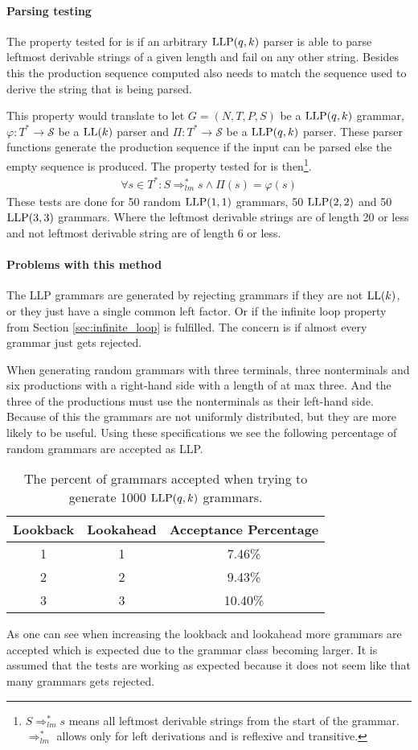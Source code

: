 \paragraph{Parsing testing}
The property tested for is if an arbitrary $\text{LLP}(q,k)$ parser is able to parse leftmost derivable strings of a given length and fail on any other string. Besides this the production sequence computed also needs to match the sequence used to derive the string that is being parsed.

This property would translate to let $G = (N, T, P, S)$ be a $\text{LLP}(q, k)$ grammar, $\varphi : T^* \to \mathcal{S}$ be a $\text{LL}(k)$ parser and $\Pi : T^* \to \mathcal{S}$ be a $\text{LLP}(q, k)$ parser. These parser functions generate the production sequence if the input can be parsed else the empty sequence is produced. The property tested for is then\footnote{$S \Rightarrow^*_{lm} s$ means all leftmost derivable strings from the start of the grammar. $\Rightarrow^*_{lm}$ allows only for left derivations and is reflexive and transitive.}.
\begin{align*}
    \forall s \in T^* : S \Rightarrow^*_{lm} s \land \Pi(s) = \varphi(s)
\end{align*}
These tests are done for 50 random $\text{LLP}(1,1)$ grammars, 50 $\text{LLP}(2,2)$ and 50 $\text{LLP}(3,3)$ grammars. Where the leftmost derivable strings are of length 20 or less and not leftmost derivable string are of length 6 or less.

\paragraph{Problems with this method}
The LLP grammars are generated by rejecting grammars if they are not $\text{LL}(k)$, or they just have a single common left factor. Or if the infinite loop property from Section \ref{sec:infinite_loop} is fulfilled. The concern is if almost every grammar just gets rejected.

When generating random grammars with three terminals, three nonterminals and six productions with a right-hand side with a length of at max three. And the three of the productions must use the nonterminals as their left-hand side. Because of this the grammars are not uniformly distributed, but they are more likely to be useful. Using these specifications we see the following percentage of random grammars are accepted as LLP.
\begin{table}[H]
    \centering
    \begin{tabular}{c|c|c}
        Lookback & Lookahead & Acceptance Percentage  \\ \hline
        1 & 1 & 7.46\%  \\\hline
        2 & 2 & 9.43\%  \\\hline
        3 & 3 & 10.40\%
    \end{tabular}
    \caption{The percent of grammars accepted when trying to generate 1000 $\text{LLP}(q, k)$ grammars.}
\end{table}
\noindent As one can see when increasing the lookback and lookahead more grammars are accepted which is expected due to the grammar class becoming larger. It is assumed that the tests are working as expected because it does not seem like that many grammars gets rejected.